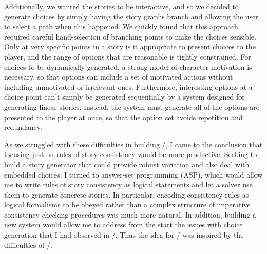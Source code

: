Additionally, we wanted the stories to be interactive, and so we decided to generate choices by simply having the story graphs branch and allowing the user to select a path when this happened.
%
We quickly found that this approach required careful hand-selection of branching points to make the choices sensible.
%
Only at very specific points in a story is it appropriate to present choices to the player, and the range of options that are reasonable is tightly constrained.
%
For choices to be dynamically generated, a strong model of character motivation is necessary, so that options can include a set of motivated actions without including unmotivated or irrelevant ones.
%
Furthermore, interesting options at a choice point can't simply be generated sequentially by a system designed for generating linear stories.
%
Instead, the system must generate all of the options are presented to the player at once, so that the option set avoids repetition and redundancy.


As we struggled with these difficulties in building \problemplanets/, I came to the conclusion that focusing just on rules of story consistency would be more productive.
%
Seeking to build a story generator that could provide robust variation and also deal with embedded choices, I turned to answer-set programming (ASP), which would allow me to write rules of story consistency as logical statements and let a solver use them to generate concrete stories.
%
In particular, encoding consistency rules as logical formalisms to be obeyed rather than a complex structure of imperative consistency-checking procedures was much more natural.
%
In addition, building a new system would allow me to address from the start the issues with choice generation that I had observed in \problemplanets/.
%
Thus the idea for \dunyazad/ was inspired by the difficulties of \problemplanets/.

